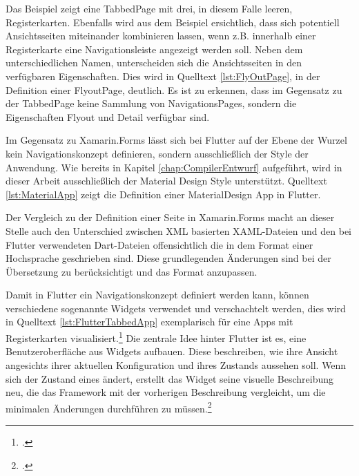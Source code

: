 \begin{minipage}{\linewidth}

\end{minipage}

Das Beispiel zeigt eine \glq TabbedPage\grq{}  mit drei,  in diesem Falle leeren,  Registerkarten. Ebenfalls wird aus dem Beispiel ersichtlich, dass sich potentiell Ansichtsseiten miteinander kombinieren lassen,  wenn z.B.  innerhalb einer Registerkarte eine Navigationsleiste angezeigt werden soll.  Neben dem unterschiedlichen Namen,  unterscheiden sich die Ansichtsseiten in den verfügbaren Eigenschaften.  Dies wird in Quelltext \ref{lst:FlyOutPage},  in der Definition einer \glq FlyoutPage\grq , deutlich.  Es ist zu erkennen, dass im Gegensatz zu der \glq TabbedPage\grq{}  keine Sammlung von \glq NavigationsPages\grq ,  sondern die Eigenschaften \glq Flyout\grq{}  und \glq Detail\grq{}  verfügbar sind.  

\begin{minipage}{\linewidth}

\end{minipage}

Im Gegensatz zu Xamarin.Forms lässt sich bei Flutter auf der Ebene der Wurzel kein Navigationskonzept definieren,  sondern ausschließlich der Style der Anwendung.  Wie bereits in Kapitel \ref{chap:CompilerEntwurf} aufgeführt, wird in dieser Arbeit ausschließlich der Material Design Style unterstützt. Quelltext \ref{lst:MaterialApp} zeigt die Definition einer MaterialDesign App in Flutter.

\begin{minipage}{\linewidth}

\end{minipage}

Der Vergleich zu der Definition einer Seite in Xamarin.Forms  macht an dieser Stelle auch den Unterschied zwischen XML basierten XAML-Dateien und den bei Flutter verwendeten Dart-Dateien offensichtlich die in dem Format einer Hochsprache geschrieben sind.  Diese grundlegenden Änderungen sind bei der Übersetzung zu berücksichtigt und das Format anzupassen. 

Damit in Flutter ein Navigationskonzept definiert werden kann,  können verschiedene sogenannte Widgets verwendet und verschachtelt werden,  dies wird in Quelltext \ref{lst:FlutterTabbedApp} exemplarisch für eine Apps mit Registerkarten visualisiert.\footcite[Vgl.][Abgerufen am \today]{GoogleFlutterTabs2020} Die zentrale Idee hinter Flutter ist es,  eine Benutzeroberfläche aus Widgets aufbauen.  Diese beschreiben, wie ihre Ansicht angesichts ihrer aktuellen Konfiguration und ihres Zustands aussehen soll.  Wenn sich der Zustand eines ändert, erstellt das Widget seine visuelle Beschreibung neu,  die das Framework mit der vorherigen Beschreibung vergleicht, um die minimalen Änderungen durchführen zu müssen.\footcite[Vgl.][Abgerufen am \today]{GoogleWidgets2020} 

